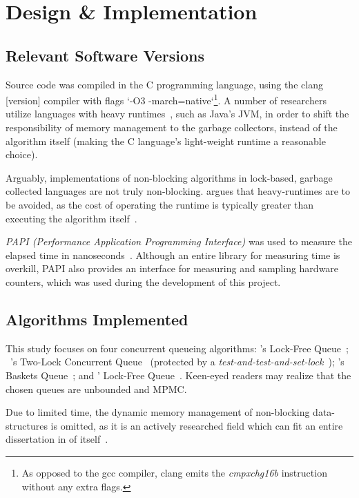 \chapter{Design \& Implementation}

\section{Relevant Software Versions}
Source code was compiled in the C programming language, using the clang
[version] compiler with flags `-O3 -march=native`\footnote{As opposed to the
gcc compiler, clang emits the \emph{cmpxchg16b} instruction without any extra flags.}. A number of researchers
utilize languages with heavy runtimes~\citep{kogan2011wait}, such as Java's JVM,
in order to shift the responsibility of memory management to the garbage
collectors, instead of the algorithm itself (making the C language's
light-weight runtime a reasonable choice).

Arguably, implementations of non-blocking algorithms in lock-based, garbage
collected languages are not truly non-blocking. \citeauthor{fog2020optimizing} argues that heavy-runtimes
are to be avoided, as the cost of operating the runtime is
typically greater than executing the algorithm
itself~\citep{fog2020optimizing}.

\emph{PAPI (Performance Application Programming Interface)} was used to measure
the elapsed time in nanoseconds~\citep{terpstra2010papi}. Although an entire library for measuring time 
is overkill, PAPI also provides an interface for measuring and
sampling hardware counters, which was used during the development of this project.

\section{Algorithms Implemented}
This study focuses on four concurrent queueing algorithms:
\citeauthor{michael1996simple}'s Lock-Free Queue~\citep{michael1996simple};
~\citeauthor{michael1996simple}'s Two-Lock Concurrent
Queue~\citep{michael1996simple} (protected by a \emph{test-and-test-and-set-lock}~\citep{mellor1991algorithms}); \citeauthor{hoffman2007baskets}'s Baskets
Queue~\citep{hoffman2007baskets}; and \citeauthor{valois1994queues}' Lock-Free
Queue~\citep{valois1994queues}. Keen-eyed readers may realize that the chosen
queues are unbounded and MPMC.

Due to limited time, the dynamic memory management of non-blocking
data-structures is omitted, as it is an actively researched field which can fit
an entire dissertation in of itself~\citep{valois1995datastructures,michael2004hazard}.


